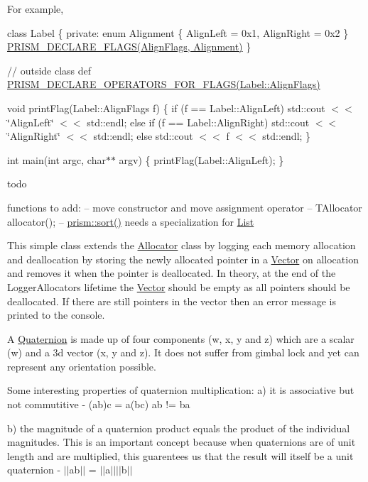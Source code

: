 For example,

class Label \{ private\+: enum Alignment \{ Align\+Left = 0x1, Align\+Right = 0x2 \} \hyperlink{_flags_8h_aa5aa2c9827ab949836e20999b9a068ec}{P\+R\+I\+S\+M\+\_\+\+D\+E\+C\+L\+A\+R\+E\+\_\+\+F\+L\+A\+G\+S(\+Align\+Flags, Alignment)} \}

// outside class def \hyperlink{_flags_8h_ae8aabb683a18b872a4449769b82e8e15}{P\+R\+I\+S\+M\+\_\+\+D\+E\+C\+L\+A\+R\+E\+\_\+\+O\+P\+E\+R\+A\+T\+O\+R\+S\+\_\+\+F\+O\+R\+\_\+\+F\+L\+A\+G\+S(\+Label\+::\+Align\+Flags)}

void print\+Flag(\+Label\+::\+Align\+Flags f) \{ if (f == Label\+::\+Align\+Left) std\+::cout $<$$<$ \char`\"{}\+Align\+Left\char`\"{} $<$$<$ std\+::endl; else if (f == Label\+::\+Align\+Right) std\+::cout $<$$<$ \char`\"{}\+Align\+Right\char`\"{} $<$$<$ std\+::endl; else std\+::cout $<$$<$ f $<$$<$ std\+::endl; \}

int main(int argc, char$\ast$$\ast$ argv) \{ print\+Flag(\+Label\+::\+Align\+Left); \}

todo

functions to add\+: -- move constructor and move assignment operator -- T\+Allocator allocator(); -- \hyperlink{namespaceprism_addfe9ea0146b59b2b16adee4cd2220b9}{prism\+::sort()} needs a specialization for \hyperlink{classprism_1_1_list}{List}

This simple class extends the \hyperlink{classprism_1_1_allocator}{Allocator} class by logging each memory allocation and deallocation by storing the newly allocated pointer in a \hyperlink{classprism_1_1_vector}{Vector} on allocation and removes it when the pointer is deallocated. In theory, at the end of the Logger\+Allocator\textquotesingle{}s lifetime the \hyperlink{classprism_1_1_vector}{Vector} should be empty as all pointers should be deallocated. If there are still pointers in the vector then an error message is printed to the console.

A \hyperlink{classprism_1_1_quaternion}{Quaternion} is made up of four components (w, x, y and z) which are a scalar (w) and a 3d vector (x, y and z). It does not suffer from gimbal lock and yet can represent any orientation possible.

Some interesting properties of quaternion multiplication\+: a) it is associative but not commutitive -\/ (ab)c = a(bc) ab != ba

b) the magnitude of a quaternion product equals the product of the individual magnitudes. This is an important concept because when quaternions are of unit length and are multiplied, this guarentees us that the result will itself be a unit quaternion -\/ $\vert$$\vert$ab$\vert$$\vert$ = $\vert$$\vert$a$\vert$$\vert$$\vert$$\vert$b$\vert$$\vert$

